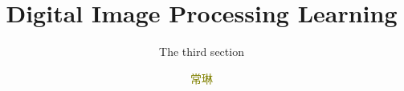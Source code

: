 \documentclass[notheorems, serif, table, compress]{beamer}  %
\begin{document}
\title{Digital Image Processing Learning}
\subtitle{The third section}
\author[]{\textcolor{olive}{常琳}}
\frame{ \titlepage }
\def\hilite<#1>{\temporal<#1>{\color{blue!15}}{\color{black}}{\color{black}}}
\newcommand{\shadow}[2][purple]{\hskip5pt\shadowbox{\color{#1}\small \kai #2\vspace{3mm}}}
\newcommand{\colorrbox}[2][purple]{\doublebox{\color{#1}\small \kai#2}}

\end{document}
